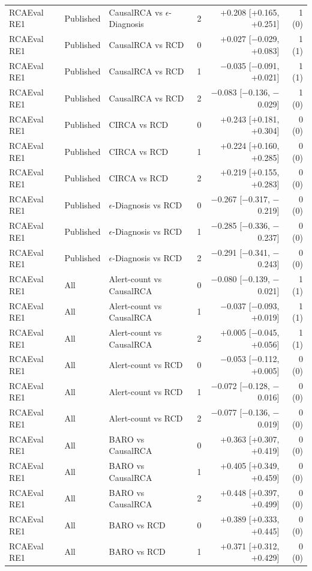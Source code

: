 {\begin{longtable}{llllrr}
RCAEval RE1 & Published & CausalRCA vs $\epsilon$-Diagnosis & 2 & +0.208 [+0.165, +0.251] & 1 (0) \\
RCAEval RE1 & Published & CausalRCA vs RCD & 0 & +0.027 [$-$0.029, +0.083] & 1 (1) \\
RCAEval RE1 & Published & CausalRCA vs RCD & 1 & $-$0.035 [$-$0.091, +0.021] & 1 (1) \\
RCAEval RE1 & Published & CausalRCA vs RCD & 2 & $-$0.083 [$-$0.136, $-$0.029] & 1 (0) \\
RCAEval RE1 & Published & CIRCA vs RCD & 0 & +0.243 [+0.181, +0.304] & 0 (0) \\
RCAEval RE1 & Published & CIRCA vs RCD & 1 & +0.224 [+0.160, +0.285] & 0 (0) \\
RCAEval RE1 & Published & CIRCA vs RCD & 2 & +0.219 [+0.155, +0.283] & 0 (0) \\
RCAEval RE1 & Published & $\epsilon$-Diagnosis vs RCD & 0 & $-$0.267 [$-$0.317, $-$0.219] & 0 (0) \\
RCAEval RE1 & Published & $\epsilon$-Diagnosis vs RCD & 1 & $-$0.285 [$-$0.336, $-$0.237] & 0 (0) \\
RCAEval RE1 & Published & $\epsilon$-Diagnosis vs RCD & 2 & $-$0.291 [$-$0.341, $-$0.243] & 0 (0) \\
RCAEval RE1 & All & Alert-count vs CausalRCA & 0 & $-$0.080 [$-$0.139, $-$0.021] & 1 (1) \\
RCAEval RE1 & All & Alert-count vs CausalRCA & 1 & $-$0.037 [$-$0.093, +0.019] & 1 (1) \\
RCAEval RE1 & All & Alert-count vs CausalRCA & 2 & +0.005 [$-$0.045, +0.056] & 1 (1) \\
RCAEval RE1 & All & Alert-count vs RCD & 0 & $-$0.053 [$-$0.112, +0.005] & 0 (0) \\
RCAEval RE1 & All & Alert-count vs RCD & 1 & $-$0.072 [$-$0.128, $-$0.016] & 0 (0) \\
RCAEval RE1 & All & Alert-count vs RCD & 2 & $-$0.077 [$-$0.136, $-$0.019] & 0 (0) \\
RCAEval RE1 & All & BARO vs CausalRCA & 0 & +0.363 [+0.307, +0.419] & 0 (0) \\
RCAEval RE1 & All & BARO vs CausalRCA & 1 & +0.405 [+0.349, +0.459] & 0 (0) \\
RCAEval RE1 & All & BARO vs CausalRCA & 2 & +0.448 [+0.397, +0.499] & 0 (0) \\
RCAEval RE1 & All & BARO vs RCD & 0 & +0.389 [+0.333, +0.445] & 0 (0) \\
RCAEval RE1 & All & BARO vs RCD & 1 & +0.371 [+0.312, +0.429] & 0 (0) \\

\end{longtable}}
